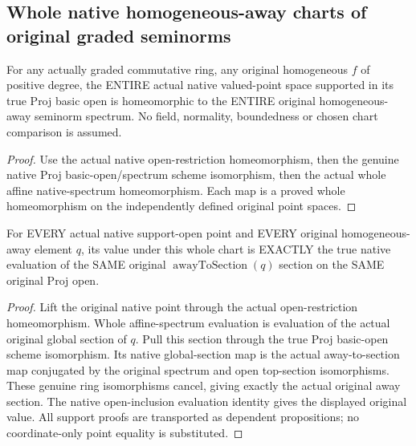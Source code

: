 \subsection{Whole native homogeneous-away charts of original graded seminorms}

\begin{definition}
\label{projective:actual-whole-graded-native-away-chart}
\leanok
For any actually graded commutative ring, any original homogeneous $f$ of
positive degree, the ENTIRE actual native valued-point space supported
in its true Proj basic open is homeomorphic to the ENTIRE original
homogeneous-away seminorm spectrum. No field, normality, boundedness or
chosen chart comparison is assumed.
\end{definition}
\begin{proof}
Use the actual native open-restriction homeomorphism, then the genuine
native Proj basic-open/spectrum scheme isomorphism, then the actual
whole affine native-spectrum homeomorphism. Each map is a proved whole
homeomorphism on the independently defined original point spaces.
\end{proof}

\begin{lemma}
\label{projective:actual-whole-graded-away-chart-value}
\leanok
{}
For EVERY actual native support-open point and EVERY original
homogeneous-away element $q$, its value under this whole chart is
EXACTLY the true native evaluation of the SAME original
$\operatorname{awayToSection}(q)$ section on the SAME original Proj open.
\end{lemma}
\begin{proof}
Lift the original native point through the actual open-restriction
homeomorphism. Whole affine-spectrum evaluation is evaluation of the
actual original global section of $q$. Pull this section through the
true Proj basic-open scheme isomorphism. Its native global-section map
is the actual away-to-section map conjugated by the original spectrum
and open top-section isomorphisms. These genuine ring isomorphisms
cancel, giving exactly the actual original away section. The native
open-inclusion evaluation identity gives the displayed original value.
All support proofs are transported as dependent propositions; no
coordinate-only point equality is substituted.
\end{proof}

